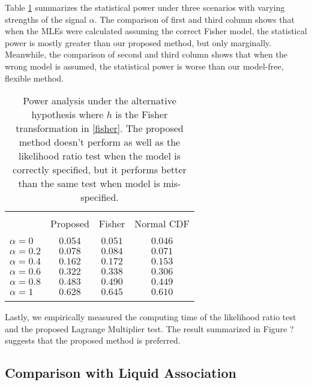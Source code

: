 \documentclass[12pt]{extarticle}
\theoremstyle{theorem}
\begin{document}
\noindent Table \ref{mle_power} summarizes the statistical power under three scenarios with varying strengths of the signal $\alpha$. The comparison of first and third column shows that when the MLEs were calculated assuming the correct Fisher model, the statistical power is mostly greater than our proposed method, but only marginally. Meanwhile, the comparison of second and third column shows that when the wrong model is assumed, the statistical power is worse than our model-free, flexible method. \\

\begin{table}[!htbp] \centering 
\begin{tabular}{lccc} 
\\[-1.8ex]\hline 
\hline \\[-1.8ex] 
& Proposed & Fisher & Normal CDF \\ 
\hline \\[-1.8ex] 
$\alpha = 0$ & $0.054$ & $0.051$ & $0.046$ \\ 
$\alpha = 0.2$ & $0.078$ & $0.084$ & $0.071$  \\ 
$\alpha = 0.4$ & $0.162$ & $0.172$ & $0.153$ \\ 
$\alpha = 0.6$ & $0.322$ & $0.338$ & $0.306$  \\ 
$\alpha = 0.8$ & $0.483$ & $0.490$ & $0.449$ \\ 
$\alpha = 1$ & $0.628$ & $0.645$ & $0.610$ \\ 
\hline \\[-1.8ex] 
\end{tabular} 
  \caption{  \label{mle_power}  Power analysis under the alternative hypothesis where $h$ is the Fisher transformation in \ref{fisher}. The proposed method doesn't perform as well as the likelihood ratio test when the model is correctly specified, but it performs better than the same test when model is mis-specified. } 
\end{table}

\noindent Lastly, we empirically measured the computing time of the likelihood ratio test and the proposed Lagrange Multiplier test. The result summarized in Figure ? suggests that the proposed method is preferred.

\subsection{Comparison with Liquid Association}
\end{document}

